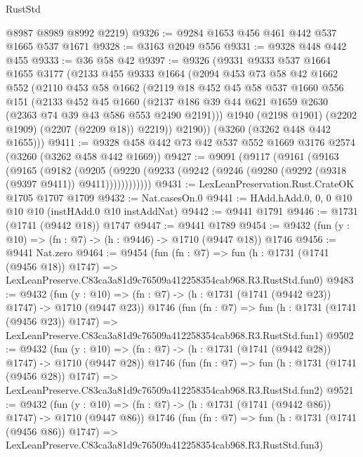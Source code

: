 \begin{lexlean}{RustStd}
\begin{coremodule}
      @8987
      @8989
      @8992
      @2219)
@9326 := @9284 @1653 @456 @461 @442 @537 @1665 @537 @1671
@9328 := @3163 @2049 @556
@9331 := @9328 @448 @442 @455
@9333 := @36 @58 @42
@9397 := @9326
    (@9331
      @9333
      @537
      @1664
      @1655
      @3177
      (@2133
        @455
        @9333
        @1664
        (@2094
          @453
          @73
          @58
          @42
          @1662
          @552
          (@2110
            @453
            @58
            @1662
            (@2119
              @18
              @452
              @45
              @58
              @537
              @1660
              @556
              @151
              (@2133
                @452
                @45
                @1660
                (@2137 @186 @39 @44 @621 @1659 @2630 (@2363 @74 @39 @43 @586 @553 @2490 @2191)))
              @1940
              (@2198 @1901)
              (@2202 @1909)
              (@2207 (@2209 @18))
              @2219))
          @2190))
      (@3260 (@3262 @448 @442 @1655)))
@9411 := @9328 @458 @442 @73 @42 @537 @552 @1669 @3176 @2574 (@3260 (@3262 @458 @442 @1669))
@9427 := @9091
    (@9117
      (@9161
        (@9163
          (@9165
            (@9182
              (@9205
                (@9220 (@9233 (@9242 (@9246 (@9280 (@9292 (@9318 (@9397 @9411)) @9411))))))))))))
@9431 := LexLeanPreservation.Rust.CrateOK @1705 @1707 @1709
@9432 := Nat.casesOn.{0}
@9441 := HAdd.hAdd.{0, 0, 0} @10 @10 @10 (instHAdd.{0} @10 instAddNat)
@9442 := @9441 @1791
@9446 := @1731 (@1741 (@9442 @18)) @1747
@9447 := @9441 @1789
@9454 := @9432 (fun (y : @10) => (fn : @7) -> (h : @9446) -> @1710 (@9447 @18)) @1746
@9456 := @9441 Nat.zero
@9464 := @9454
    (fun (fn : @7) =>
    fun (h : @1731 (@1741 (@9456 @18)) @1747) =>
    LexLeanPreserve.C83ca3a81d9c76509a412258354cab968.R3.RustStd.fun0)
@9483 := @9432
    (fun (y : @10) => (fn : @7) -> (h : @1731 (@1741 (@9442 @23)) @1747) -> @1710 (@9447 @23))
    @1746
    (fun (fn : @7) =>
    fun (h : @1731 (@1741 (@9456 @23)) @1747) =>
    LexLeanPreserve.C83ca3a81d9c76509a412258354cab968.R3.RustStd.fun1)
@9502 := @9432
    (fun (y : @10) => (fn : @7) -> (h : @1731 (@1741 (@9442 @28)) @1747) -> @1710 (@9447 @28))
    @1746
    (fun (fn : @7) =>
    fun (h : @1731 (@1741 (@9456 @28)) @1747) =>
    LexLeanPreserve.C83ca3a81d9c76509a412258354cab968.R3.RustStd.fun2)
@9521 := @9432
    (fun (y : @10) => (fn : @7) -> (h : @1731 (@1741 (@9442 @86)) @1747) -> @1710 (@9447 @86))
    @1746
    (fun (fn : @7) =>
    fun (h : @1731 (@1741 (@9456 @86)) @1747) =>
    LexLeanPreserve.C83ca3a81d9c76509a412258354cab968.R3.RustStd.fun3)

\end{coremodule}
\end{lexlean}
